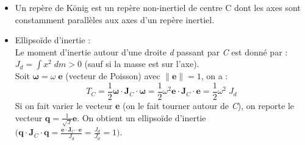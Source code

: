 \documentclass[a4paper]{article}
\newcommand\irregularcircle[2]{%
  \pgfextra {\pgfmathsetmacro\len{(#1)+rand*(#2)}}
  +(0:\len pt)
  \foreach \a in {10,20,...,350}{
    \pgfextra {\pgfmathsetmacro\len{(#1)+rand*(#2)}}
    -- +(\a:\len pt)
  } -- cycle
}
\begin{document}
\begin{itemize}
\item Un repère de König est un repère non-inertiel de centre C dont les axes sont constamment parallèles aux axes d'un repère inertiel.
\begin{center}  \end{center}





\item Ellipsoïde d'inertie : \\
Le moment d'inertie autour d'une droite \emph{d} passant par \emph{C} est donné par : $\displaystyle J_d = \int x^2 \; d m > 0 $ (sauf si la masse est sur l'axe). \\
Soit $ \boldsymbol{\omega} = \omega \; \textbf{e} $ (vecteur de Poisson) avec $ \| \textbf{e} \| = 1 $, on a : 
\[ T_C = \frac{1}{2} \boldsymbol{\omega} \cdot\textbf{J}_C \cdot \boldsymbol{\omega} = \frac{1}{2} \omega^2 \textbf{e} \cdot \textbf{J}_C \cdot \textbf{e} = \frac{1}{2} \omega^2 \; J_d \]
Si on fait varier le vecteur \textbf{e} (on le fait tourner autour de \emph{C}), on reporte le vecteur $\displaystyle \textbf{q} = \frac{1}{\sqrt{J}} \textbf{e} $. On obtient un ellipsoïde d'inertie $\displaystyle \Big( \textbf{q} \cdot \textbf{J}_C \cdot \textbf{q} = \frac{\textbf{e} \cdot \textbf{J}_C \cdot \textbf{e}}{J_d} = \frac{J_d}{J_d} = 1 \Big) $.


\end{itemize}
\end{document}

